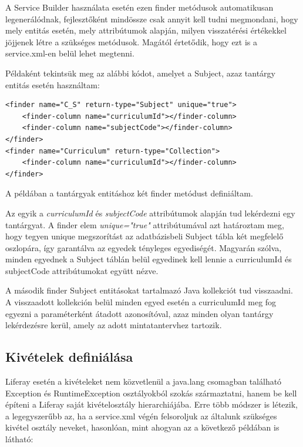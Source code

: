 \documentclass[hidelinks, 12pt, a4paper]{report}
\begin{document}
A Service Builder használata esetén ezen finder metódusok automatikusan legenerálódnak, fejlesztőként mindössze csak annyit kell tudni megmondani, hogy mely entitás esetén, mely attribútumok alapján, milyen visszatérési értékekkel jöjjenek létre a szükséges metódusok. Magától értetődik, hogy ezt is a service.xml-en belül lehet megtenni.

Példaként tekintsük meg az alábbi kódot, amelyet a Subject, azaz tantárgy entitás esetén használtam:

\begin{minipage}{\linewidth}
\begin{lstlisting}
<finder name="C_S" return-type="Subject" unique="true">
	<finder-column name="curriculumId"></finder-column>
	<finder-column name="subjectCode"></finder-column>
</finder>
<finder name="Curriculum" return-type="Collection">
	<finder-column name="curriculumId"></finder-column>
</finder>
\end{lstlisting}
\end{minipage}

A példában a tantárgyak entitáshoz két finder metódust definiáltam.

Az egyik a \emph{curriculumId} és \emph{subjectCode} attribútumok alapján tud lekérdezni egy tantárgyat. A finder elem \emph{unique="true"} attribútumával azt határoztam meg, hogy tegyen unique megszorítást az adatbázisbeli Subject tábla két megfelelő oszlopára, így garantálva az egyedek tényleges egyediségét. Magyarán szólva, minden egyednek a Subject táblán belül egyedinek kell lennie a curriculumId és subjectCode attribútumokat együtt nézve.

A második finder Subject entitásokat tartalmazó Java kollekciót tud visszaadni. A visszaadott kollekción belül minden egyed esetén a curriculumId meg fog egyezni a paraméterként átadott azonosítóval, azaz minden olyan tantárgy lekérdezésre kerül, amely az adott mintatantervhez tartozik.

\subsection{Kivételek definiálása}

Liferay esetén a kivételeket nem közvetlenül a java.lang csomagban található Exception és RuntimeException osztályokból szokás származtatni, hanem be kell építeni a Liferay saját kivételosztály hierarchiájába. Erre több módszer is létezik, a legegyszerűbb az, ha a service.xml végén felsoroljuk az általunk szükséges kivétel osztály neveket, hasonlóan, mint ahogyan az a következő példában is látható:
\end{document}
